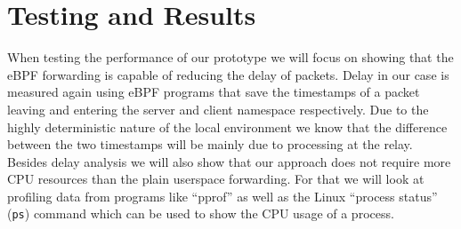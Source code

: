 \section{Testing and Results}\label{sec:testing_and_results}
When testing the performance of our prototype we will focus on showing that the eBPF forwarding
is capable of reducing the delay of packets.
Delay in our case is measured again using eBPF programs that save the timestamps of a packet 
leaving and entering the server and client namespace respectively.
Due to the highly deterministic nature of the local environment we know that the difference 
between the two timestamps will be mainly due to processing at the relay.
Besides delay analysis we will also show that our approach does not require more CPU resources
than the plain userspace forwarding.
For that we will look at profiling data from programs like ``pprof'' %
as well as the Linux ``process status'' (\verb|ps|) command which can be used to 
show the CPU usage of a process. %

